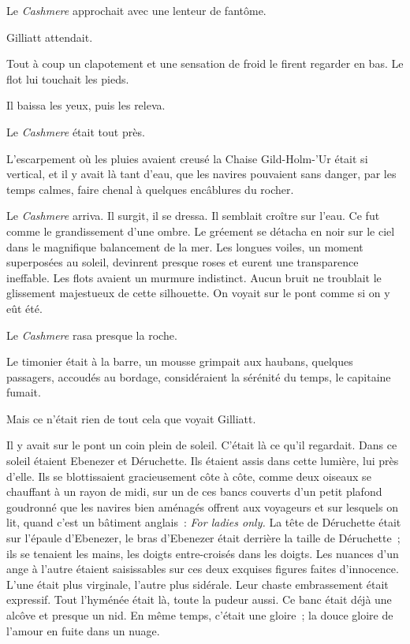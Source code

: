 \documentclass[french,twoside]{book} %
\begin{document}
Le \emph{Cashmere} approchait avec une lenteur de fantôme.\par
Gilliatt attendait.\par
Tout à coup un clapotement et une sensation de froid le firent regarder en bas. Le flot lui touchait les pieds.\par
Il baissa les yeux, puis les releva.\par
Le \emph{Cashmere} était tout près.\par
L’escarpement où les pluies avaient creusé la Chaise Gild-Holm-’Ur était si vertical, et il y avait là tant d’eau, que les navires pouvaient sans danger, par les temps calmes, faire chenal à quelques encâblures du rocher.\par
Le \emph{Cashmere} arriva. Il surgit, il se dressa. Il semblait croître sur l’eau. Ce fut comme le grandissement d’une ombre. Le gréement se détacha en noir sur le ciel dans le magnifique balancement de la mer. Les longues voiles, un moment superposées au soleil, devinrent presque roses et eurent une transparence ineffable. Les flots avaient un murmure indistinct. Aucun bruit ne troublait le glissement majestueux de cette silhouette. On voyait sur le pont comme si on y eût été.\par
Le \emph{Cashmere} rasa presque la roche.\par
Le timonier était à la barre, un mousse grimpait aux haubans, quelques passagers, accoudés au bordage, considéraient la sérénité du temps, le capitaine fumait.\par
 Mais ce n’était rien de tout cela que voyait Gilliatt.\par
Il y avait sur le pont un coin plein de soleil. C’était là ce qu’il regardait. Dans ce soleil étaient Ebenezer et Déruchette. Ils étaient assis dans cette lumière, lui près d’elle. Ils se blottissaient gracieusement côte à côte, comme deux oiseaux se chauffant à un rayon de midi, sur un de ces bancs couverts d’un petit plafond goudronné que les navires bien aménagés offrent aux voyageurs et sur lesquels on lit, quand c’est un bâtiment anglais : \emph{For ladies only.} La tête de Déruchette était sur l’épaule d’Ebenezer, le bras d’Ebenezer était derrière la taille de Déruchette ; ils se tenaient les mains, les doigts entre-croisés dans les doigts. Les nuances d’un ange à l’autre étaient saisissables sur ces deux exquises figures faites d’innocence. L’une était plus virginale, l’autre plus sidérale. Leur chaste embrassement était expressif. Tout l’hyménée était là, toute la pudeur aussi. Ce banc était déjà une alcôve et presque un nid. En même temps, c’était une gloire ; la douce gloire de l’amour en fuite dans un nuage.\par
\end{document}
